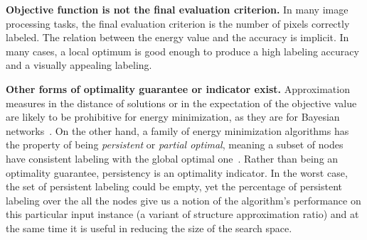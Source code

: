 

\textbf{Objective function is not the final evaluation criterion.} In many image processing tasks, the final evaluation criterion is the number of pixels correctly labeled. The relation between the energy value and the accuracy is implicit. In many cases, a local optimum is good enough to produce a high labeling accuracy and a visually appealing labeling.

\textbf{Other forms of optimality guarantee or indicator exist.} %
%
Approximation measures in the distance of solutions or in the expectation of the objective value are likely to be prohibitive for energy minimization, as they are for Bayesian networks~\cite{Kwisthout-11,Kwisthout-13, kwisthout2015tree}.
On the other hand, a family of energy minimization algorithms has the property of being {\em persistent} or {\em partial optimal}, meaning a subset of nodes have consistent labeling with the global optimal one~\cite{Boros:TR91-maxflow, BorosHammer02,kohli2008partial, SSS-15-IRI,shekhovtsov-15-HO}. Rather than being an optimality guarantee, persistency is an optimality indicator. In the worst case, the set of persistent labeling could be empty, yet the percentage of persistent labeling over the all the nodes give us a notion of the algorithm's performance on this particular input instance  (a variant of structure approximation ratio) and at the same time it is useful in reducing the size of the search space. %




